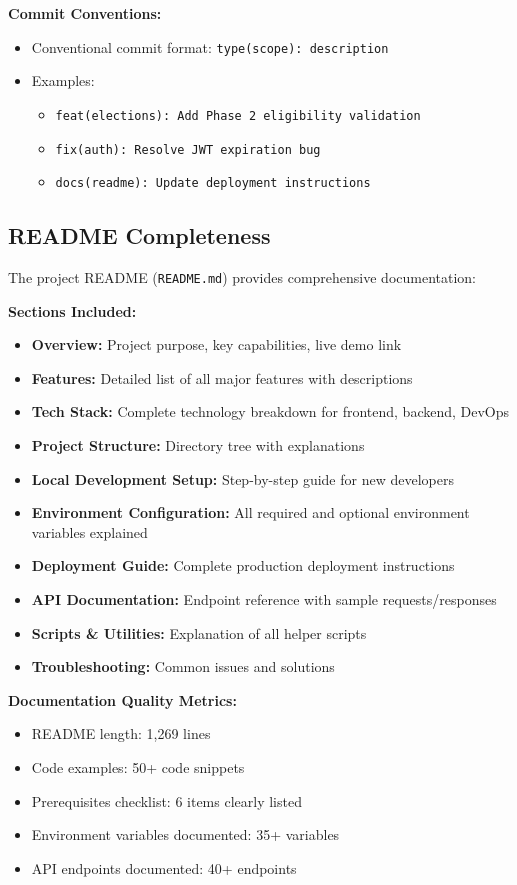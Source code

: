 \documentclass[12pt,a4paper]{article}
\begin{document}
\textbf{Commit Conventions:}
\begin{itemize}[noitemsep]
  \item Conventional commit format: \texttt{type(scope): description}
  \item Examples:
  \begin{itemize}[noitemsep]
    \item \texttt{feat(elections): Add Phase 2 eligibility validation}
    \item \texttt{fix(auth): Resolve JWT expiration bug}
    \item \texttt{docs(readme): Update deployment instructions}
  \end{itemize}
\end{itemize}

\subsection{README Completeness}

The project README (\texttt{README.md}) provides comprehensive documentation:

\textbf{Sections Included:}
\begin{itemize}[noitemsep]
  \item \textbf{Overview:} Project purpose, key capabilities, live demo link
  \item \textbf{Features:} Detailed list of all major features with descriptions
  \item \textbf{Tech Stack:} Complete technology breakdown for frontend, backend, DevOps
  \item \textbf{Project Structure:} Directory tree with explanations
  \item \textbf{Local Development Setup:} Step-by-step guide for new developers
  \item \textbf{Environment Configuration:} All required and optional environment variables explained
  \item \textbf{Deployment Guide:} Complete production deployment instructions
  \item \textbf{API Documentation:} Endpoint reference with sample requests/responses
  \item \textbf{Scripts \& Utilities:} Explanation of all helper scripts
  \item \textbf{Troubleshooting:} Common issues and solutions
\end{itemize}

\textbf{Documentation Quality Metrics:}
\begin{itemize}[noitemsep]
  \item README length: 1,269 lines
  \item Code examples: 50+ code snippets
  \item Prerequisites checklist: 6 items clearly listed
  \item Environment variables documented: 35+ variables
  \item API endpoints documented: 40+ endpoints
\end{itemize}
\end{document}
